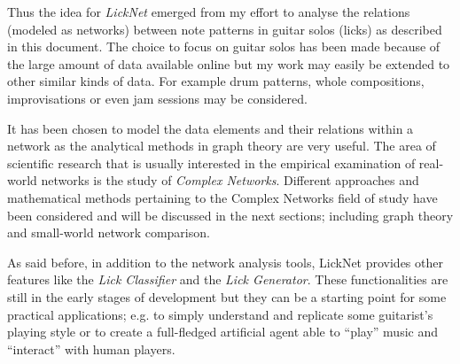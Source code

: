 \documentclass{llncs}
\begin{document}
Thus the idea for \emph{LickNet} emerged from my effort to analyse the relations (modeled as networks) between note patterns in guitar
solos (licks) as described in this document. The choice to focus on guitar solos has been made 
because of the large amount of data available online but my work may easily
be extended to other similar kinds of data. For example drum patterns, whole compositions, improvisations or even jam sessions may be considered. 

It has been chosen to model
the data elements and their relations within a network as the
analytical methods in graph theory are very useful. The area of scientific research
that is usually interested in the empirical examination of real-world networks
 is the study of \emph{Complex Networks}. Different approaches
and mathematical methods pertaining to the Complex Networks
field of study have been considered and will be discussed in the next sections; 
including graph theory and small-world network
comparison\cite{complex-networks}.

As said before, in addition to the network analysis tools, LickNet provides other
features like
the \emph{Lick Classifier} and the \emph{Lick Generator}. These
functionalities are still in the early stages of development but they can be a starting point
for some practical applications; e.g. to simply understand and replicate some guitarist's playing style or to
create a full-fledged artificial agent able to ``play'' music and ``interact'' with human players.
\end{document}
